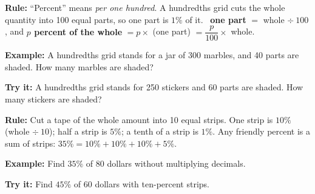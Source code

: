\documentclass[12pt]{article}
\begin{document}


\begin{formulabox}
\textbf{Rule:} ``Percent'' means \emph{per one hundred}. A hundredths grid cuts
the whole quantity into 100 equal parts, so one part is $1\%$ of it.
\ \textbf{one part} $=$ whole $\div\ 100$, and \textbf{$p$ percent of the whole}
$= p \times$ (one part) $= \dfrac{p}{100} \times$ whole.
\end{formulabox}

\begin{examplebox}
\textbf{Example:} \quad A hundredths grid stands for a jar of 300 marbles, and
40 parts are shaded. How many marbles are shaded?
\end{examplebox}

\begin{tryitbox}
\textbf{Try it:} \quad A hundredths grid stands for 250 stickers and 60 parts
are shaded. How many stickers are shaded?\\[2pt]
\end{tryitbox}


\begin{formulabox}
\textbf{Rule:} Cut a tape of the whole amount into 10 equal strips. One strip is
$10\%$ (whole $\div\ 10$); half a strip is $5\%$; a tenth of a strip is $1\%$.
Any friendly percent is a sum of strips: $35\% = 10\% + 10\% + 10\% + 5\%$.
\end{formulabox}

\begin{examplebox}
\textbf{Example:} \quad Find $35\%$ of 80 dollars without multiplying decimals.
\end{examplebox}

\begin{tryitbox}
\textbf{Try it:} \quad Find $45\%$ of 60 dollars with ten-percent
strips.\\[2pt]
\end{tryitbox}
\end{document}

